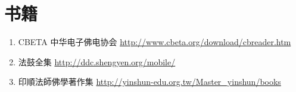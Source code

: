\chapter{书籍}
\begin{enumerate}
  \item CBETA 中华电子佛电协会 \url{http://www.cbeta.org/download/cbreader.htm}
  \item 法鼓全集 \url{http://ddc.shengyen.org/mobile/}
  \item 印順法師佛學著作集 \url{http://yinshun-edu.org.tw/Master_yinshun/books}
\end{enumerate}
